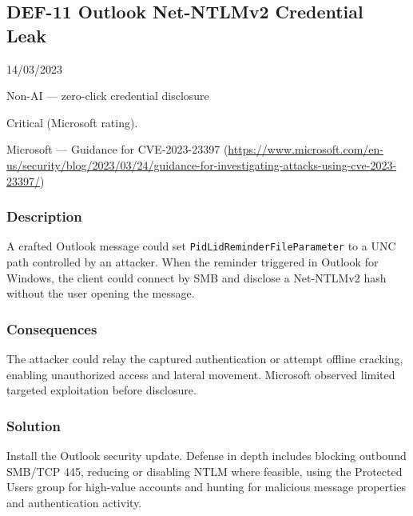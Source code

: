 \subsection{DEF-11 Outlook Net-NTLMv2 Credential Leak}

\begin{description}[style=nextline,leftmargin=3.2cm]

\item[Publicized] 14/03/2023

\item[Category] Non-AI — zero-click credential disclosure

\item[Severity] Critical (Microsoft rating).

\item[Source] Microsoft — Guidance for CVE-2023-23397 (\url{https://www.microsoft.com/en-us/security/blog/2023/03/24/guidance-for-investigating-attacks-using-cve-2023-23397/})

\end{description}

\subsubsection{Description}

A crafted Outlook message could set \texttt{PidLidReminderFileParameter} to a UNC path controlled by an attacker. When the reminder triggered in Outlook for Windows, the client could connect by SMB and disclose a Net-NTLMv2 hash without the user opening the message.

\subsubsection{Consequences}

The attacker could relay the captured authentication or attempt offline cracking, enabling unauthorized access and lateral movement. Microsoft observed limited targeted exploitation before disclosure.

\subsubsection{Solution}

Install the Outlook security update. Defense in depth includes blocking outbound SMB/TCP 445, reducing or disabling NTLM where feasible, using the Protected Users group for high-value accounts and hunting for malicious message properties and authentication activity.

